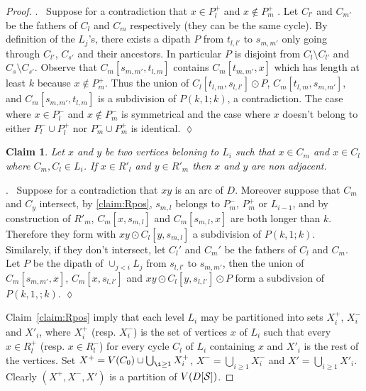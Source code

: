 \documentclass[utf8,10pt]{article}
\theoremstyle{plain}
\newtheorem{claim}{Claim}[theorem]
\theoremstyle{definition}
\theoremstyle{remark}
\newenvironment{subproof}{\par\noindent {\it Subproof}.\ }{\hfill$\lozenge$\par\vspace{11pt}}
\begin{document}
\begin{proof}
\begin{subproof}
Suppose for a contradiction that $x\in P^+_l$ and $x \not \in  P^+_m$  . %
Let $C_{l'}$ and $C_{m'}$ be the fathers of $C_l$ and $C_m$ respectively (they can be the same cycle). 
By definition of the $L_j$'s,  there exists a dipath $P$ from $t_{l,l'}$ to $s_{m,m'}$ only going through 
$C_{l'}$, $C_{s'}$ and their ancestors.
In particular $P$ is disjoint from $C_l \setminus C_{l'}$ and  $C_s \setminus C_{s'}$.
Observe that $C_m[s_{m,m'},t_{l,m}]$ contains  $C_m[t_{m,m'}, x]$ which has length at least $k$ because $x\notin P^+_m$.
Thus the union of $C_l[t_{l,m},s_{l,l'}] \odot P$, $C_m[t_{l,m},s_{m,m'}]$, 
and  $C_m[s_{m,m'},t_{l,m}]$ is a subdivision of $P(k,1;k)$, a contradiction.
The case where  $x\in P^-_l$ and $x \not \in  P^-_m$ is symmetrical and the case where $x$ doesn't belong to either $P^-_l \cup P^+_l$
nor $P^-_m \cup P^+_m$ is identical.
\end{subproof}


\begin{claim} \label{claim:X'}
Let $x$ and $y$ be two vertices beloning to $L_i$ such that $x \in C_m$ and $x \in C_l$ where $C_m, C_l \in L_i$.
If $x \in R'_l$ and $y \in R'_m$ then $x$ and $y$ are non adjacent.
\end{claim}

\begin{subproof}
Suppose for a contradiction that $xy$ is an arc of $D$. Moreover suppose that $C_m$ and $C_y$ intersect, by \ref{claim:Rpos}, $s_{m,l}$
belongs to $P^-_m$, $P^+_m$ or $L_{i-1}$, and by construction of $R'_m$, $C_m[x,s_{m,l}]$ and 
$C_m[s_{m,l},x]$ are both longer than $k$. Therefore they form with $xy \odot C_l[y,s_{m,l}]$ a subdivision of $P(k,1;k)$.
Similarely, if they don't intersect, let $C_l'$ and $C_m'$ be the fathers of $C_l$ and $C_m$. 
Let $P$ be the dipath of $\cup_{j<i} L_j$ from $s_{l,l'}$ to $s_{m,m'}$, then the union of $C_m[s_{m,m'}, x]$, $C_m[x,s_{l,l'}]$ and
$xy \odot C_l[y, s_{l,l'}] \odot P$ form a subdivsion of $P(k,1,;k)$.
\end{subproof}

Claim~\ref{claim:Rpos} imply that each level $L_i$ may be partitioned into sets $X^+_i$, $X^-_i$ and $X'_i$, where
$X^+_i$ (resp.  $X^-_i$) is the set of vertices $x$ of $L_i$ such that every $x\in R^+_l$ (resp. $x\in R^-_l$)
for every cycle $C_l$ of $L_i$ containing $x$ and $X'_i$ is the rest of the vertices. 
Set $X^+=V(C_0) \cup \bigcup_{\i\geq 1} X^+_i$, $X^-=\bigcup_{i\geq 1} X^-_i$ and $X'=\bigcup_{i\geq 1} X'_i$.
Clearly $(X^+, X^-, X')$ is a partition of $V(D[{\cal S}])$.


\end{proof}
\end{document}
